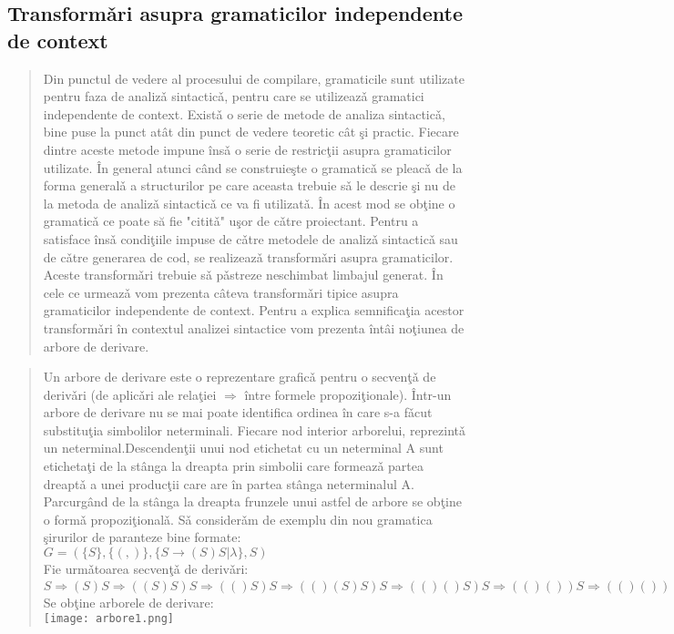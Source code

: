 \subsection{Transform\v ari asupra gramaticilor independente de context}
\begin{quotation}
Din punctul de vedere al procesului de compilare, gramaticile sunt utilizate pentru faza de analiz\v a 
sintactic\v a, pentru care se utilizeaz\v a gramatici independente de context. Exist\v a o serie de metode de analiza sintactic\v a, bine puse la punct at\^ at din punct de vedere teoretic c\^ at şi practic. Fiecare dintre aceste metode impune \^ins\v a o serie de restric\c tii asupra gramaticilor utilizate. \^In general atunci c\^ and se construie\c ste o gramatic\v a se pleac\v a de la forma general\v a a structurilor pe care aceasta trebuie s\v a le descrie \c si nu de la metoda de analiz\v a sintactic\v a ce va fi utilizat\v a. \^In acest mod se ob\c tine o gramatic\v a ce poate să fie "citit\v a" u\c sor de c\v atre proiectant. Pentru a satisface \^ ins\v a condi\c tiile impuse de c\v atre metodele de analiz\v a sintactic\v a sau de c\v atre generarea de cod, se realizeaz\v a transform\v ari asupra gramaticilor. Aceste transform\v ari trebuie s\v a p\v astreze neschimbat limbajul generat. \^In cele ce urmeaz\v a vom prezenta c\^ ateva transform\v ari tipice asupra gramaticilor independente de context. Pentru a explica semnifica\c tia acestor transform\v ari \^ in contextul analizei sintactice vom prezenta \^ int\^ ai no\c tiunea de arbore de derivare. 
\end{quotation}
\begin{quotation}
 Un arbore de derivare este o reprezentare grafic\v a pentru o secven\c t\v a de deriv\v ari (de aplic\v ari ale rela\c tiei $\Rightarrow$ \^ intre formele propozi\c tionale). \^ Intr-un arbore de derivare nu se mai poate identifica ordinea \^ in care s-a  f\v acut substitu\c tia simbolilor neterminali. Fiecare nod interior arborelui, reprezint\v a un neterminal.Descenden\c tii unui nod etichetat cu un neterminal A sunt eticheta\c ti de la st\^ anga la dreapta prin simbolii care formeaz\v a partea dreapt\v a a unei produc\c tii care are \^ in partea st\^ anga neterminalul A. Parcurg\^ and de la st\^ anga la dreapta frunzele unui astfel de arbore se ob\c tine o form\v a propozi\c tional\v a. S\v a consider\v am de exemplu din nou gramatica \c sirurilor de paranteze bine formate:\\
$  G = (\lbrace S \rbrace, \lbrace(,)\rbrace, \lbrace S → (S)S \vert \lambda \rbrace, S)$ \\
Fie urm\v atoarea secven\c t\v a de deriv\v ari:\\
$ S \Rightarrow ( S ) S \Rightarrow ( ( S ) S ) S \Rightarrow ( () S ) S \Rightarrow 
 ( () ( S ) S ) S \Rightarrow ( () () S ) S \Rightarrow 
 ( () () ) S \Rightarrow ( () () ) ( S ) S \Rightarrow^{*}( ()() ) ()$\\
 Se ob\c tine arborele de derivare:\\
 \texttt{[image: arbore1.png]}
 \label{arbore1}
\end{quotation}
